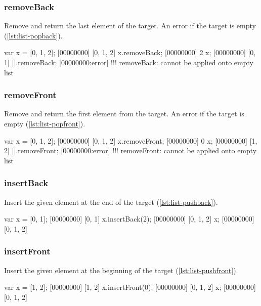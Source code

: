 \subsubsection{removeBack}

Remove and return the last element of the target. An error if the
target is empty (\autoref{lst:list-popback}).

\begin{urbiscript}[caption=List.removeBack, label=lst:list-popback]
var x = [0, 1, 2];
[00000000] [0, 1, 2]
x.removeBack;
[00000000] 2
x;
[00000000] [0, 1]
[].removeBack;
[00000000:error] !!! removeBack: cannot be applied onto empty list
\end{urbiscript}

\subsubsection{removeFront}

Remove and return the first element from the target. An error if the
target is empty (\autoref{lst:list-popfront}).

\begin{urbiscript}[caption=List.removeFront, label=lst:list-popfront]
var x = [0, 1, 2];
[00000000] [0, 1, 2]
x.removeFront;
[00000000] 0
x;
[00000000] [1, 2]
[].removeFront;
[00000000:error] !!! removeFront: cannot be applied onto empty list
\end{urbiscript}

\subsubsection{insertBack}
\label{sec:std-list-pushback}

Insert the given element at the end of the target
(\autoref{lst:list-pushback}).

\begin{urbiscript}[caption=List.insertBack, label=lst:list-pushback]
var x = [0, 1];
[00000000] [0, 1]
x.insertBack(2);
[00000000] [0, 1, 2]
x;
[00000000] [0, 1, 2]
\end{urbiscript}

\subsubsection{insertFront}

Insert the given element at the beginning of the target
(\autoref{lst:list-pushfront}).

\begin{urbiscript}[caption=List.insertFront, label=lst:list-pushfront]
var x = [1, 2];
[00000000] [1, 2]
x.insertFront(0);
[00000000] [0, 1, 2]
x;
[00000000] [0, 1, 2]
\end{urbiscript}

